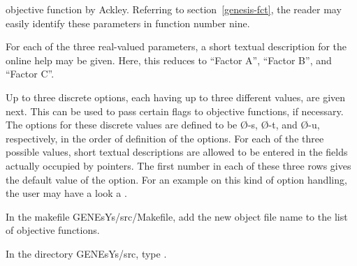 \begin{Enumerate}
\begin{Itemize}
		objective function by Ackley.
		Referring to section~\ref{genesis-fct}, the reader may easily
		identify these parameters in function number nine.
	\item	For each of the three real-valued parameters, a short textual
		description for the online help may be given.
		Here, this reduces to ``Factor A'', ``Factor B'', and
		``Factor C''.
	\item	Up to three discrete options, each having up to three
		different values, are given next.
		This can be used to pass certain flags to objective functions,
		if necessary.
		The options for these discrete values are defined to be
		\O{-s}, \O{-t}, and \O{-u}, respectively,
		in the order of definition of the options.
		For each of the three possible values, short textual 
		descriptions are allowed to be entered in the fields
		actually occupied by  pointers.
		The first number in each of these three rows gives the 
		default value of the option.
		For an example on this kind of option handling, the user
		may have a look a .
	\end{Itemize}
%
\item	In the makefile GENEsYs/src/Makefile, add the new object file name
	 to the list  of objective functions.
%
\item	In the directory GENEsYs/src, type .
%
\end{Enumerate}

